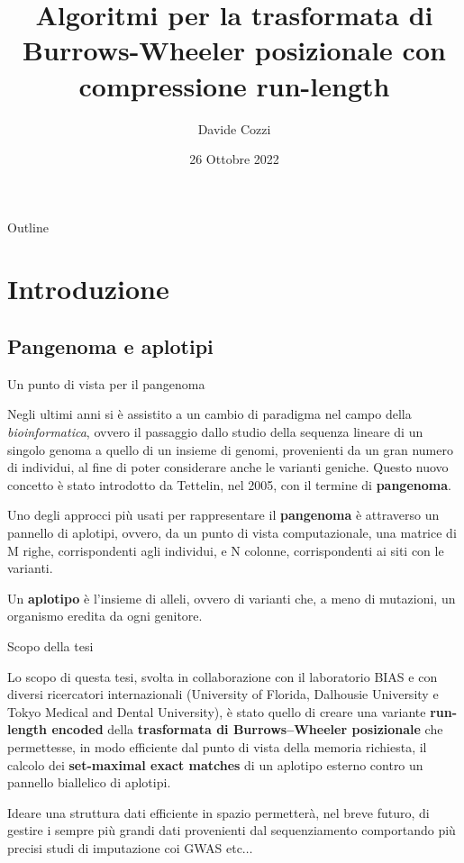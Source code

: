 \documentclass[]{beamer}
\title[Algoritmi per la $\RLPBWT$] {Algoritmi per la trasformata di
  Burrows-Wheeler posizionale con compressione run-length}
\author[Davide Cozzi]{\Large{Davide Cozzi}}
\institute[] {\large{\textbf{{\color{nord2}Relatore:}}
    \textit{Prof.ssa~Raffaella 
      Rizzi}\quad 
    \textbf{\color{nord2}{Correlatore:}} \textit{Dr.~Yuri Pirola}}\\
  \vspace{4mm}
  \small{\textit{Dipartimento di Informatica, Sistemistica e Comunicazione
      (DISCo)\\
      Università degli Studi di Milano Bicocca}}}
\date[26/10/2022] {26 Ottobre 2022}
\begin{document}
\begin{frame}
  \titlepage
\end{frame}

\begin{frame}{Outline}
  \setcounter{tocdepth}{1}
  \tableofcontents
\end{frame}
\section{Introduzione}
\subsection{Pangenoma e aplotipi}
\begin{frame}{Un punto di vista per il pangenoma}
  \begin{block}{}
    \small{
    Negli ultimi anni si è assistito a un cambio di paradigma nel campo della
    \textit{bioinformatica}, ovvero il passaggio dallo studio della sequenza
    lineare di 
    un singolo genoma a quello di un insieme di genomi, provenienti da un gran
    numero di individui, al fine di poter considerare anche le varianti geniche.
    Questo nuovo concetto è stato introdotto da Tettelin, nel 2005, con il
    termine di \textbf{pangenoma}.}
  \end{block}
  \begin{block}{}
    \small{
    Uno degli approcci più usati per rappresentare il \textbf{pangenoma}
    è attraverso un pannello di aplotipi, ovvero, da un punto di vista
    computazionale, una matrice di M righe, corrispondenti agli individui, e N
    colonne, corrispondenti ai siti con le varianti. }
  \end{block}
  \begin{block}{}
    \small{
    Un \textbf{aplotipo} è  l'insieme di alleli, ovvero di
    varianti che, a meno di mutazioni, un organismo eredita da ogni genitore. }
  \end{block}
\end{frame}
\begin{frame}{Scopo della tesi}
  \begin{alertblock}{}
    Lo scopo di questa tesi, svolta in collaborazione con il laboratorio BIAS e
    con diversi ricercatori internazionali (University of Florida, Dalhousie
    University e Tokyo Medical and Dental University), è stato quello di creare
    una variante \textbf{run-length encoded} della \textbf{trasformata di
      Burrows--Wheeler posizionale} che permettesse, in modo efficiente dal
    punto di vista della memoria richiesta, il calcolo dei
    \textbf{set-maximal exact matches} di un aplotipo esterno contro un pannello
    biallelico di aplotipi.
  \end{alertblock}
  \begin{block}{}
    Ideare una struttura dati efficiente in spazio permetterà, nel breve futuro,
    di gestire i sempre più grandi dati provenienti dal sequenziamento
   comportando più precisi studi di imputazione coi GWAS etc$\ldots$
  \end{block}
\end{frame}
\end{document}
